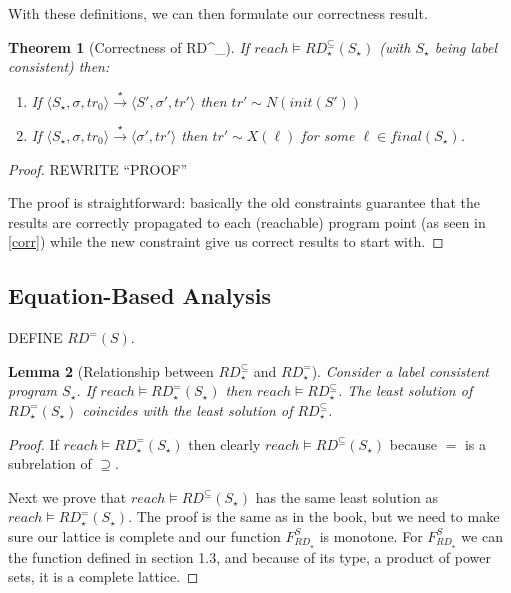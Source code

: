 \documentclass[a4wide,12pt]{article}
\theoremstyle{definition}
\theoremstyle{plain}
\newtheorem{theo}{Theorem}
\newtheorem{lemma}[theo]{Lemma}
\theoremstyle{remark}
\def\const#1{\mathopen{\langle}#1\mathclose{\rangle}} %
\def\pair#1{\const{#1}}
\def\starto{\overset{\star}{\to}}
\def\rdsub{RD^\subseteq(S_\star)}
\begin{document}
With these definitions, we can then formulate our correctness result.
\begin{theo}[Correctness of RD^\subseteq_\star]
If $reach \models RD_\star^\subseteq(S_\star)$ (with $S_\star$ being label consistent) then:

\begin{enumerate}
\item If $\pair{S_\star, \sigma, tr_0} \starto \pair{S', \sigma', tr'}$ then $ tr' \sim
N(init(S'))$ 
\item If $\pair{S_\star, \sigma, tr_0} \starto \pair{\sigma', tr'}$ then $ tr' \sim
X(\ell)$ for some $\ell \in final(S_\star)$.
\end{enumerate}
\end{theo}
\begin{proof}
REWRITE ``PROOF''
 
The proof is straightforward: basically the old constraints guarantee that the results are correctly propagated to each (reachable)
program point (as seen in \ref{corr}) while the new constraint give us correct results to start with.
\end{proof}

 
\subsection*{Equation-Based Analysis}

DEFINE $RD^=(S)$.


\begin{lemma}[Relationship between $RD_\star^\subseteq$ and $RD_\star^=$]
Consider a label consistent program $S_\star$.  If $reach \models RD_\star^=(S_\star)$
then $reach \models RD_\star^\subseteq$. The least solution of $RD_\star^=(S_\star)$ coincides
with the least solution of $RD_\star^\subseteq$.
\end{lemma}
\begin{proof}
If $reach \models RD_\star^=(S_\star)$
then clearly $reach \models \rdsub$ because $=$ is a subrelation of $\supseteq$.

Next we prove that $reach \models \rdsub$ has the same least solution
as  $reach \models RD_\star^=(S_\star)$. The proof is the same as in the book, but we
need to make sure our lattice is complete and our function $F_{RD_\star}^S$ is monotone.
For $F_{RD_\star}^S$ we can the function defined in section 1.3, and because of its
type, a product of power sets, it is a complete lattice.
\end{proof}
\end{document}

